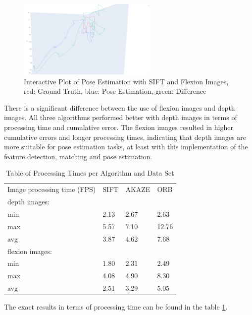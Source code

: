 \documentclass[conference, a4paper]{IEEEtran}
\begin{document}
\begin{figure}[h]
	\centering
	\includegraphics[width=0.6\textwidth]{pics/newplot.png}
	\caption{Interactive Plot of Pose Estimation with SIFT and Flexion Images, red: Ground Truth, blue: Pose Estimation, green: Difference}
	\label{Pic3}
\end{figure}
There is a significant difference between the use of flexion images and depth images. All three algorithms performed better with depth images in terms of processing time and cumulative error. The flexion images resulted in higher cumulative errors and longer processing times, indicating that depth images are more suitable for pose estimation tasks, at least with this implementation of the feature detection, matching and pose estimation.

\begin{table}[]
	\label{tab1}
	\begin{center}
		\begin{tabular}{llll}
			Image processing time (FPS) & SIFT & AKAZE & ORB   \\
			depth images:               &      &       &       \\
			min                         & 2.13 & 2.67  & 2.63  \\
			max                         & 5.57 & 7.10  & 12.76 \\
			avg                         & 3.87 & 4.62  & 7.68  \\
			flexion images:             &      &       &       \\
			min                         & 1.80 & 2.31  & 2.49  \\
			max                         & 4.08 & 4.90  & 8.30  \\
			avg                         & 2.51 & 3.29  & 5.05 
		\end{tabular}
		\caption{Table of Processing Times per Algorithm and Data Set}
	\end{center}
\end{table}
The exact results in terms of processing time can be found in the table \ref{tab1}. 
\end{document}
